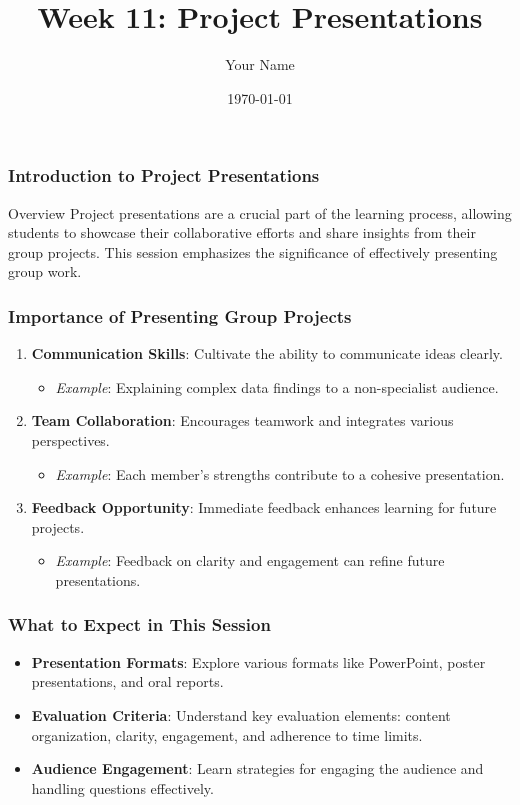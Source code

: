 \documentclass{beamer}
\title{Week 11: Project Presentations}
\author{Your Name}
\institute{Your Institution}
\date{\today}
\begin{document}
\frame{\titlepage}

\begin{frame}[fragile]
    \frametitle{Introduction to Project Presentations}
    \begin{block}{Overview}
        Project presentations are a crucial part of the learning process, allowing students to showcase their collaborative efforts and share insights from their group projects. This session emphasizes the significance of effectively presenting group work.
    \end{block}
\end{frame}

\begin{frame}[fragile]
    \frametitle{Importance of Presenting Group Projects}
    \begin{enumerate}
        \item \textbf{Communication Skills}: Cultivate the ability to communicate ideas clearly.
            \begin{itemize}
                \item \textit{Example}: Explaining complex data findings to a non-specialist audience.
            \end{itemize}
        \item \textbf{Team Collaboration}: Encourages teamwork and integrates various perspectives.
            \begin{itemize}
                \item \textit{Example}: Each member’s strengths contribute to a cohesive presentation.
            \end{itemize}
        \item \textbf{Feedback Opportunity}: Immediate feedback enhances learning for future projects.
            \begin{itemize}
                \item \textit{Example}: Feedback on clarity and engagement can refine future presentations.
            \end{itemize}
    \end{enumerate}
\end{frame}

\begin{frame}[fragile]
    \frametitle{What to Expect in This Session}
    \begin{itemize}
        \item \textbf{Presentation Formats}: Explore various formats like PowerPoint, poster presentations, and oral reports.
        \item \textbf{Evaluation Criteria}: Understand key evaluation elements: content organization, clarity, engagement, and adherence to time limits.
        \item \textbf{Audience Engagement}: Learn strategies for engaging the audience and handling questions effectively.
    \end{itemize}
\end{frame}
\end{document}
